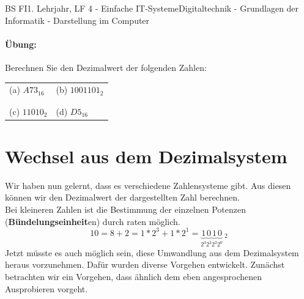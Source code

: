 \documentclass[11pt,twocolumn,oneside,openany,headings=optiontotoc,11pt,numbers=noenddot]{article}
\begin{document}
\begin{worksheet}{BS FI}{1. Lehrjahr, LF 4 - Einfache IT-Systeme}{Digitaltechnik - Grundlagen der Informatik - Darstellung im Computer}
		\paragraph{Übung:} Berechnen Sie den Dezimalwert der folgenden Zahlen:\\
		\par\noindent
		\begin{tabularx}{0.45\textwidth}{M|M}
			(a) \(A73_{16}\) & (b) \(1001101_{2}\)\\
			& \\
			\hline
			& \\
			(c) \(11010_{2}\) & (d) \(D5_{16}\)\\
		\end{tabularx}
		\newpage
		\section{Wechsel aus dem Dezimalsystem}
		Wir haben nun gelernt, dass es verschiedene Zahlensysteme gibt. Aus diesen können wir den Dezimalwert der dargestellten Zahl berechnen.\\
		Bei kleineren Zahlen ist die Bestimmung der einzelnen Potenzen (\textbf{Bündelungseinheit}en) durch raten möglich.\\
		\[10 = 8 + 2 = 1*2^3 + 1*2^1 = \underbrace{1}_{2^3}\underbrace{0}_{2^2}\underbrace{1}_{2^2}\underbrace{0}_{2^0}\ _{2}\]
		Jetzt müsste es auch möglich sein, diese Umwandlung aus dem Dezimalsystem heraus vorzunehmen. Dafür wurden diverse Vorgehen entwickelt. Zunächst betrachten wir ein Vorgehen, dass ähnlich dem eben angesprochenen \grq{}Ausprobieren\grq{} vorgeht.\\

\end{worksheet}
\end{document}
